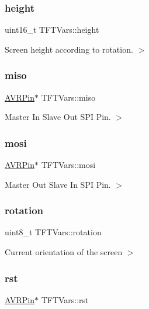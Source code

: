 \subsubsection{\texorpdfstring{height}{height}}
{\footnotesize\ttfamily uint16\+\_\+t T\+F\+T\+Vars\+::height}

Screen height according to rotation. $>$ \mbox{\label{struct_t_f_t_vars_a0743c02a07fcf6c9f0189996d3fc88be}} 
\subsubsection{\texorpdfstring{miso}{miso}}
{\footnotesize\ttfamily \mbox{\hyperlink{struct_a_v_r_pin}{A\+V\+R\+Pin}}$\ast$ T\+F\+T\+Vars\+::miso}

Master In Slave Out S\+PI Pin. $>$ \mbox{\label{struct_t_f_t_vars_acd8d54cf531c902adaf564d6375828f2}} 
\subsubsection{\texorpdfstring{mosi}{mosi}}
{\footnotesize\ttfamily \mbox{\hyperlink{struct_a_v_r_pin}{A\+V\+R\+Pin}}$\ast$ T\+F\+T\+Vars\+::mosi}

Master Out Slave In S\+PI Pin. $>$ \mbox{\label{struct_t_f_t_vars_a610c6fea289d857fa54eab7f9d1ec45d}} 
\subsubsection{\texorpdfstring{rotation}{rotation}}
{\footnotesize\ttfamily uint8\+\_\+t T\+F\+T\+Vars\+::rotation}

Current orientation of the screen $>$ \mbox{\label{struct_t_f_t_vars_aa6a6519059e0590fa51bffc2de45da15}} 
\subsubsection{\texorpdfstring{rst}{rst}}
{\footnotesize\ttfamily \mbox{\hyperlink{struct_a_v_r_pin}{A\+V\+R\+Pin}}$\ast$ T\+F\+T\+Vars\+::rst}

